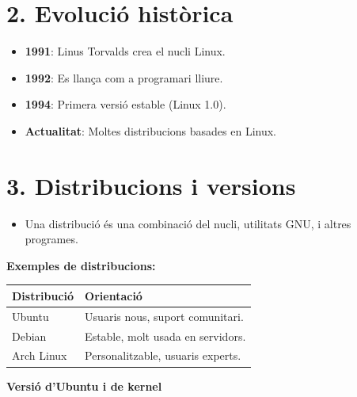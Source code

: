 \documentclass[
  catalan,
  a4paper,
]{article}
\providecommand{\tightlist}{%
  \setlength{\itemsep}{0pt}\setlength{\parskip}{0pt}}
\begin{document}
\section{2. Evolució històrica}\label{evoluciuxf3-histuxf2rica}

\begin{itemize}
\tightlist
\item
  \textbf{1991}: Linus Torvalds crea el nucli Linux.
\item
  \textbf{1992}: Es llança com a programari lliure.
\item
  \textbf{1994}: Primera versió estable (Linux 1.0).
\item
  \textbf{Actualitat}: Moltes distribucions basades en Linux.
\end{itemize}

\section{3. Distribucions i versions}\label{distribucions-i-versions}

\begin{itemize}
\tightlist
\item
  Una distribució és una combinació del nucli, utilitats GNU, i altres
  programes.
\end{itemize}

\textbf{Exemples de distribucions:}

\begin{longtable}[]{@{}ll@{}}
\toprule\noalign{}
\textbf{Distribució} & \textbf{Orientació} \\
\midrule\noalign{}
\endhead
\bottomrule\noalign{}
\endlastfoot
Ubuntu & Usuaris nous, suport comunitari. \\
Debian & Estable, molt usada en servidors. \\
Arch Linux & Personalitzable, usuaris experts. \\
\end{longtable}

\textbf{Versió d'Ubuntu i de kernel}
\end{document}
